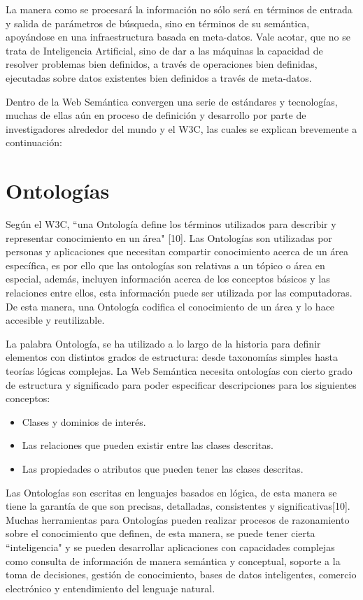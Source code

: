 La manera como se procesará la información no sólo será en términos de entrada y salida de parámetros de búsqueda, sino en términos de su semántica, apoyándose en una infraestructura basada en meta-datos. Vale acotar, que no se trata de Inteligencia Artificial, sino de dar a las máquinas la capacidad de resolver problemas bien definidos, a través de operaciones bien definidas, ejecutadas sobre datos existentes bien definidos a través de meta-datos.

Dentro de la Web Semántica convergen una serie de estándares y tecnologías, muchas de ellas aún en proceso de definición y desarrollo por parte de investigadores alrededor del mundo y el W3C, las cuales se explican brevemente a continuación:

\section{Ontologías}

Según el W3C, ``una Ontología define los términos utilizados para describir y representar conocimiento en un área" [10]. Las Ontologías son utilizadas por personas y aplicaciones que necesitan compartir conocimiento acerca de un área específica, es por ello que las ontologías son relativas a un tópico o área en especial, además, incluyen información acerca de los conceptos básicos y las relaciones entre ellos, esta información puede ser utilizada por las computadoras. De esta manera, una Ontología codifica el conocimiento de un área y lo hace accesible y reutilizable.

La palabra Ontología, se ha utilizado a lo largo de la historia para definir elementos con distintos grados de estructura: desde taxonomías simples hasta teorías lógicas complejas. La Web Semántica necesita ontologías con cierto grado de estructura y significado para poder especificar descripciones para los siguientes conceptos:

\begin{itemize}
\item Clases y dominios de interés.
\item Las relaciones que pueden existir entre las clases descritas.
\item Las propiedades o atributos que pueden tener las clases descritas.
\end{itemize}

Las Ontologías son escritas en lenguajes basados en lógica, de esta manera se tiene la garantía de que son precisas, detalladas, consistentes y significativas[10]. Muchas herramientas para Ontologías pueden realizar procesos de razonamiento sobre el conocimiento que definen, de esta manera, se puede tener cierta ``inteligencia" y se pueden desarrollar aplicaciones con capacidades complejas como consulta de información de manera semántica y conceptual, soporte a la toma de decisiones, gestión de conocimiento, bases de datos inteligentes, comercio electrónico y entendimiento del lenguaje natural.


